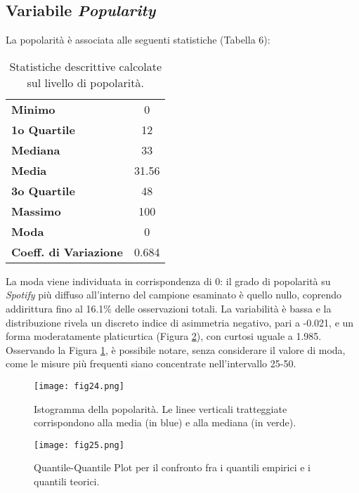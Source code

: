 \documentclass[fleqn,10pt]{SelfArx} %
\begin{document}
\subsection*{Variabile \textit{Popularity}}
La popolarità è associata alle seguenti statistiche (Tabella 6):
{\begin{table}[H]
\centering
\begin{tabular}[t]{lc}
\toprule
\midrule
\textbf{Minimo}&0\\
\textbf{1o Quartile}&12\\
\textbf{Mediana}&33\\
\textbf{Media}&31.56\\
\textbf{3o Quartile}&48\\
\textbf{Massimo}&100\\
\textbf{Moda}&0\\
\textbf{Coeff. di Variazione}&0.684\\
\bottomrule
\end{tabular}
\caption{Statistiche descrittive calcolate sul livello di popolarità.}
\end{table}}
La moda viene individuata in corrispondenza di 0: il grado di popolarità su \textit{Spotify} più diffuso all'interno del campione esaminato è quello nullo, coprendo addirittura fino al 16.1\% delle osservazioni totali. La variabilità è bassa e la distribuzione rivela un discreto indice di asimmetria negativo, pari a -0.021, e un forma moderatamente platicurtica (Figura \ref{fig:fig25}), con curtosi uguale a 1.985. Osservando la Figura \ref{fig:fig24}, è possibile notare, senza considerare il valore di moda, come le misure più frequenti siano concentrate nell'intervallo 25-50.
\begin{figure}[H]
    \centering
    \texttt{[image: fig24.png]}
    \label{fig:fig24}
    \caption{Istogramma della popolarità. Le linee verticali tratteggiate corrispondono alla media (in blue) e alla mediana (in verde).}
\end{figure}
\begin{figure}[H]
    \centering
    \texttt{[image: fig25.png]}
    \label{fig:fig25}
    \caption{Quantile-Quantile Plot per il confronto fra i quantili empirici e i quantili teorici.}
\end{figure}
\end{document}
